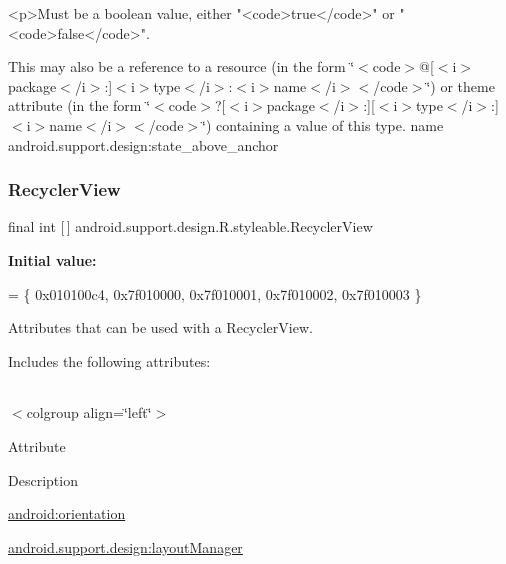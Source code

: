 \begin{DoxyVerb}      <p>Must be a boolean value, either "<code>true</code>" or "<code>false</code>".
\end{DoxyVerb}
 

This may also be a reference to a resource (in the form \char`\"{}$<$code$>$@\mbox{[}$<$i$>$package$<$/i$>$\+:\mbox{]}$<$i$>$type$<$/i$>$\+:$<$i$>$name$<$/i$>$$<$/code$>$\char`\"{}) or theme attribute (in the form \char`\"{}$<$code$>$?\mbox{[}$<$i$>$package$<$/i$>$\+:\mbox{]}\mbox{[}$<$i$>$type$<$/i$>$\+:\mbox{]}$<$i$>$name$<$/i$>$$<$/code$>$\char`\"{}) containing a value of this type.  name android.\+support.\+design\+:state\+\_\+above\+\_\+anchor \mbox{\label{classandroid_1_1support_1_1design_1_1R_1_1styleable_a1700d79470c52662f934bd53b1a05a14}} 
\subsubsection{\texorpdfstring{Recycler\+View}{RecyclerView}}
{\footnotesize\ttfamily final int \mbox{[}$\,$\mbox{]} android.\+support.\+design.\+R.\+styleable.\+Recycler\+View\hspace{0.3cm}{\ttfamily [static]}}

{\bfseries Initial value\+:}
\begin{DoxyCode}
= \{
            0x010100c4, 0x7f010000, 0x7f010001, 0x7f010002,
            0x7f010003
        \}
\end{DoxyCode}
Attributes that can be used with a Recycler\+View. 

Includes the following attributes\+:

\tabulinesep=1mm
\begin{longtabu} spread 0pt [c]{*{0}{|X[-1]}|}
\hline
\end{longtabu}
$<$colgroup align=\char`\"{}left\char`\"{}$>$ 

Attribute

Description 

{\ttfamily \hyperlink{classandroid_1_1support_1_1design_1_1R_1_1styleable_a70a6b71799c01329fe792b3d3d68b6d0}{android\+:orientation}}

{\ttfamily \hyperlink{classandroid_1_1support_1_1design_1_1R_1_1styleable_ab43560bb439ac1da32a6c932be37da34}{android.\+support.\+design\+:layout\+Manager}}

